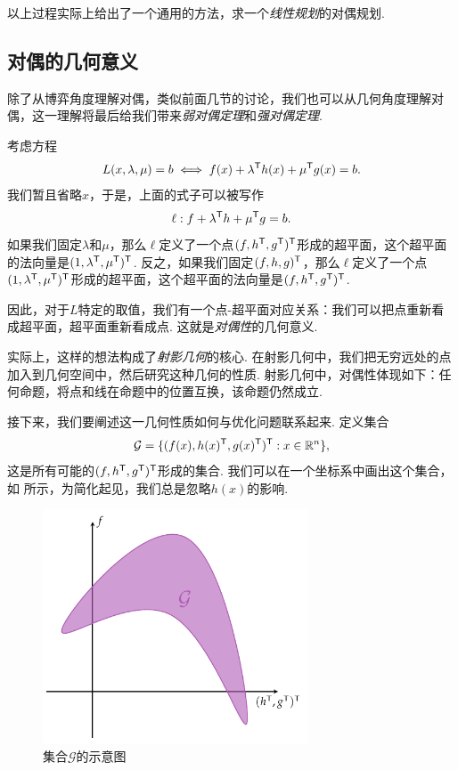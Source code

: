 \begin{remark}
    以上过程实际上给出了一个通用的方法，求一个\emph{线性规划}的对偶规划. 
\end{remark}

\subsection{对偶的几何意义}

除了从博弈角度理解对偶，类似前面几节的讨论，我们也可以从几何角度理解对偶，这一理解将最后给我们带来\emph{弱对偶定理}和\emph{强对偶定理}.

考虑方程
\[L(x,\lambda,\mu)=b\iff f(x)+\lambda^{\mathsf{T}} h(x)+\mu^{\mathsf{T}} g(x)=b.\]
我们暂且省略$x$，于是，上面的式子可以被写作
\[\ell: f+\lambda^{\mathsf{T}} h+\mu^{\mathsf{T}} g=b.\]
如果我们固定$\lambda$和$\mu$，那么$\ell$定义了一个点$(f,h^{\mathsf{T}},g^{\mathsf{T}})^{\mathsf{T}}$形成的超平面，这个超平面的法向量是$(1,\lambda^{\mathsf{T}},\mu^{\mathsf{T}})^{\mathsf{T}}$. 反之，如果我们固定$(f,h,g)^{\mathsf{T}}$，那么$\ell$定义了一个点$(1,\lambda^{\mathsf{T}},\mu^{\mathsf{T}})^{\mathsf{T}}$形成的超平面，这个超平面的法向量是$(f,h^{\mathsf{T}},g^{\mathsf{T}})^{\mathsf{T}}$.

因此，对于$L$特定的取值，我们有一个点-超平面对应关系：我们可以把点重新看成超平面，超平面重新看成点. 这就是\emph{对偶性}的几何意义.

\begin{remark}
    实际上，这样的想法构成了\emph{射影几何}的核心. 在射影几何中，我们把无穷远处的点加入到几何空间中，然后研究这种几何的性质. 射影几何中，对偶性体现如下：任何命题，将点和线在命题中的位置互换，该命题仍然成立. 
\end{remark}

接下来，我们要阐述这一几何性质如何与优化问题联系起来. 定义集合
\[\mathcal{G}=\{(f(x),h(x)^{\mathsf{T}},g(x)^{\mathsf{T}})^{\mathsf{T}}:x\in\mathbb{R}^n\},\]
这是所有可能的$(f,h^{\mathsf{T}},g^{\mathsf{T}})^{\mathsf{T}}$形成的集合. 我们可以在一个坐标系中画出这个集合，如 所示，为简化起见，我们总是忽略$h(x)$的影响.

\begin{figure}[htbp]
    \centering
    \includegraphics[width=0.7\textwidth]{figures/duality/duality-G-set.pdf}
    \caption{集合$\mathcal{G}$的示意图}
    \label{fig:duality-G-set}
\end{figure}

